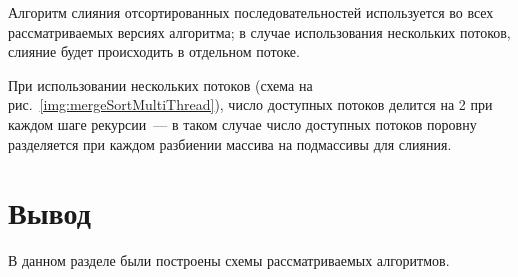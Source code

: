 \newpage

Алгоритм слияния отсортированных последовательностей используется во всех рассматриваемых версиях алгоритма; в случае использования нескольких потоков, слияние будет происходить в отдельном потоке.

При использовании нескольких потоков (схема на рис.~\ref{img:mergeSortMultiThread}), число доступных потоков делится на 2 при каждом шаге рекурсии~--- в таком случае число доступных потоков поровну разделяется при каждом разбиении массива на подмассивы для слияния.

\section*{Вывод}
В данном разделе  были построены схемы рассматриваемых алгоритмов.
